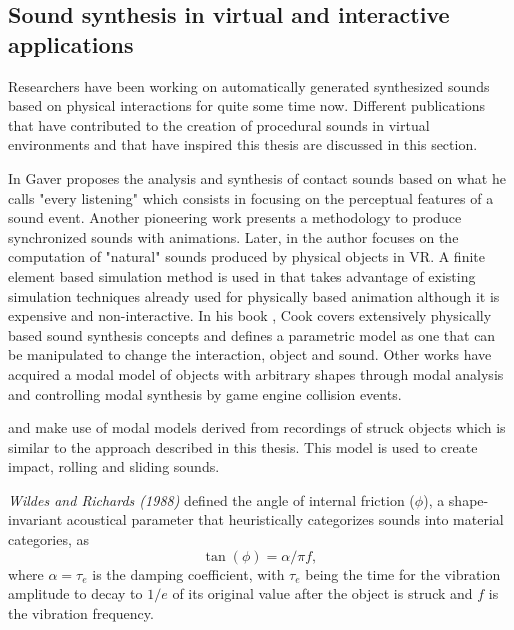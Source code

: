 \subsection{Sound synthesis in virtual and interactive applications}

Researchers have been working on automatically generated synthesized sounds based on physical interactions for quite some time now. Different publications that have contributed to the creation of procedural sounds in virtual environments and that have inspired this thesis are discussed in this section.

In \cite{gaver1993we, gaver1993world} Gaver proposes the analysis and synthesis of contact sounds based on what he calls "every listening" which consists in focusing on the perceptual features of a sound event. Another pioneering work \cite{takala1992sound} presents a methodology to produce synchronized sounds with animations. Later, in \cite{doel1998sound} the author focuses on the computation of "natural" sounds produced by physical objects in VR. A finite element based simulation method is used in \cite{director2001synthesizing} that takes advantage of existing simulation techniques already used for physically based animation although it is expensive and non-interactive. In his book \cite{Cook:2002:RSS:515316}, Cook covers extensively physically based sound synthesis concepts and defines a parametric model as one that can be manipulated to change the interaction, object and sound.  Other works have acquired a modal model of objects with arbitrary shapes through modal analysis \cite{james2006precomputed, raghuvanshi2006interactive} and controlling modal synthesis by game engine collision events.

\cite{van2001foleyautomatic} and \cite{lloyd2011sound} make use of modal models derived from recordings of struck objects which is similar to the approach described in this thesis. This model is used to create impact, rolling and sliding sounds.

\textit{Wildes and Richards (1988)} defined the angle of internal friction ($\phi$), a shape-invariant acoustical parameter that heuristically categorizes sounds into material categories, as
\begin{equation}\label{eq:tanf}
\tan(\phi) = \alpha / \pi f,
\end{equation}
where $\alpha = \tau_e$ is the damping coefficient, with $\tau_e$ being the time for the vibration amplitude to decay to $1/e$ of its original value after the object is struck  and $f$ is the vibration frequency\cite{giordano2006material}.

